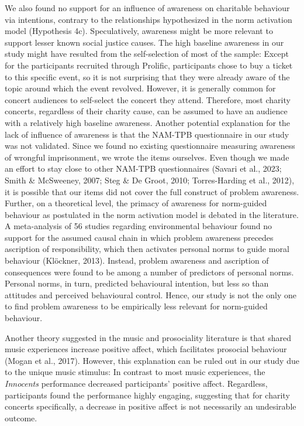 \documentclass[
  man,floatsintext]{apa6}
\begin{document}
We also found no support for an influence of awareness on charitable behaviour via intentions, contrary to the relationships hypothesized in the norm activation model (Hypothesis 4c). Speculatively, awareness might be more relevant to support lesser known social justice causes. The high baseline awareness in our study might have resulted from the self-selection of most of the sample: Except for the participants recruited through Prolific, participants chose to buy a ticket to this specific event, so it is not surprising that they were already aware of the topic around which the event revolved. However, it is generally common for concert audiences to self-select the concert they attend. Therefore, most charity concerts, regardless of their charity cause, can be assumed to have an audience with a relatively high baseline awareness. Another potential explanation for the lack of influence of awareness is that the NAM-TPB questionnaire in our study was not validated. Since we found no existing questionnaire measuring awareness of wrongful imprisonment, we wrote the items ourselves. Even though we made an effort to stay close to other NAM-TPB questionnaires (Savari et al., 2023; Smith \& McSweeney, 2007; Steg \& De Groot, 2010; Torres-Harding et al., 2012), it is possible that our items did not cover the full construct of problem awareness. Further, on a theoretical level, the primacy of awareness for norm-guided behaviour as postulated in the norm activation model is debated in the literature. A meta-analysis of 56 studies regarding environmental behaviour found no support for the assumed causal chain in which problem awareness precedes ascription of responsibility, which then activates personal norms to guide moral behaviour (Klöckner, 2013). Instead, problem awareness and ascription of consequences were found to be among a number of predictors of personal norms. Personal norms, in turn, predicted behavioural intention, but less so than attitudes and perceived behavioural control. Hence, our study is not the only one to find problem awareness to be empirically less relevant for norm-guided behaviour.

Another theory suggested in the music and prosociality literature is that shared music experiences increase positive affect, which facilitates prosocial behaviour (Mogan et al., 2017). However, this explanation can be ruled out in our study due to the unique music stimulus: In contrast to most music experiences, the \emph{Innocents} performance decreased participants' positive affect. Regardless, participants found the performance highly engaging, suggesting that for charity concerts specifically, a decrease in positive affect is not necessarily an undesirable outcome.
\end{document}
